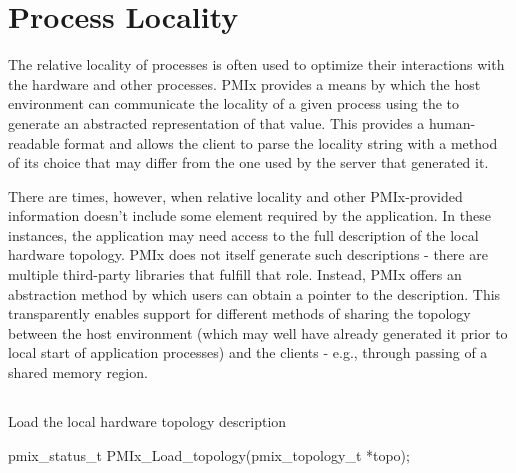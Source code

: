 \section{Process Locality}
\label{chap:api_proc_mgmt:locality}

The relative locality of processes is often used to optimize their interactions with the hardware and other processes. \ac{PMIx} provides a means by which the host environment can communicate the locality of a given process using the  to generate an abstracted representation of that value. This provides a human-readable format and allows the client to parse the locality string with a method of its choice that may differ from the one used by the server that generated it.

There are times, however, when relative locality and other \ac{PMIx}-provided
information doesn't include some element required by the application. In these
instances, the application may need access to the full description of the
local hardware topology. \ac{PMIx} does not itself generate such descriptions
- there are multiple third-party libraries that fulfill that role. Instead,
\ac{PMIx} offers an abstraction method by which users can obtain a pointer to
the description. This transparently enables support for different methods of
sharing the topology between the host environment (which may well have already
generated it prior to local start of application processes) and the clients -
e.g., through passing of a shared memory region.

\subsection{}

\summary

Load the local hardware topology description

\format

\cspecificstart
\begin{codepar}
pmix_status_t
PMIx_Load_topology(pmix_topology_t *topo);
\end{codepar}
\cspecificend

\begin{arglist}
\end{arglist}

